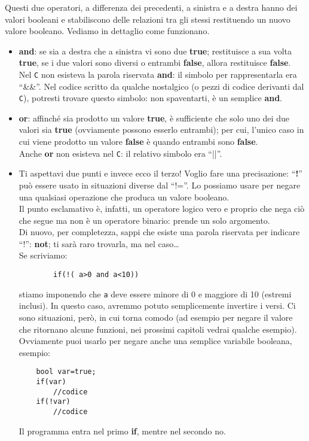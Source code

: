 	Questi due operatori, a differenza dei precedenti, a sinistra e a destra hanno dei valori booleani e stabiliscono delle relazioni tra gli stessi restituendo un nuovo valore booleano. Vediamo in dettaglio come funzionano.
	\begin{itemize}
	\item \textbf{and}: se sia a destra che a sinistra vi sono due \textbf{true}; restituisce a sua volta \textbf{true}, se i due valori sono diversi o entrambi \textbf{false}, allora restituisce \textbf{false}.
	\\Nel \verb|C| non esisteva la parola riservata \textbf{and}: il simbolo per rappresentarla era ``\&\&''. Nel codice scritto da qualche nostalgico (o pezzi di codice derivanti dal \verb|C|), potresti trovare questo simbolo: non spaventarti, è un semplice \textbf{and}.
	
	
	\item \textbf{or}: affinché sia prodotto un valore \textbf{true}, è sufficiente che solo uno dei due valori sia \textbf{true} (ovviamente possono esserlo entrambi); per cui, l'unico caso in cui viene prodotto un valore \textbf{false} è quando entrambi sono \textbf{false}.
	\\Anche \textbf{or} non esisteva nel \verb|C|: il relativo simbolo era ``||''.
	
	\item Ti aspettavi due punti e invece ecco il terzo!	Voglio fare una precisazione: ``\textbf{!}'' può essere usato in situazioni diverse dal ``!=''. Lo possiamo usare per negare una qualsiasi operazione che produca un valore booleano. 
	\\Il punto esclamativo è, infatti, un operatore logico vero e proprio che nega ciò che segue ma non è un operatore binario: prende un solo argomento.
	\\Di nuovo, per completezza, sappi che esiste una parola riservata per indicare ``!'': \textbf{not}; ti sarà raro trovarla, ma nel caso\ldots
	\\Se scriviamo:
	\begin{lstlisting}
		if(!( a>0 and a<10))
	\end{lstlisting}
	stiamo imponendo che \verb|a| deve essere minore di 0 e maggiore di 10 (estremi inclusi). In questo caso, avremmo potuto semplicemente invertire i versi. Ci sono situazioni, però, in cui torna comodo (ad esempio per negare il valore che ritornano alcune funzioni, nei prossimi capitoli vedrai qualche esempio).\\
	Ovviamente puoi usarlo per negare anche una semplice variabile booleana, esempio:
	\begin{lstlisting}
	bool var=true;
	if(var)
		//codice
	if(!var)
		//codice
	\end{lstlisting}
	Il programma entra nel primo \textbf{if}, mentre nel secondo no.
\end{itemize}
